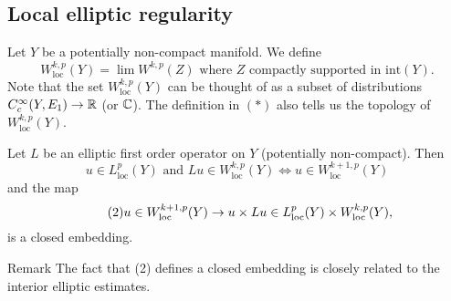 \documentclass{amsart}
\begin{document}
 \subsection*{Local elliptic regularity}
 \begin{defn}
   Let $Y$ be a potentially non-compact manifold. We define
   \begin{equation*}\tag{$\ast$}
     W^{k,p}_{\text{loc}}(Y)=\lim W^{k,p}(Z)\text{ where $Z$ compactly
       supported in $\text{int}(Y)$}.
   \end{equation*}
   Note that the set $W^{k,p}_{\text{loc}}(Y)$ can be thought of as
   a subset of distributions $C^{\infty}_{c}(Y,E_{1})\to \mathbb{R}$ (or
   $\mathbb{C}$). The definition in $(\ast)$ also tells us the topology of
   $W^{k,p}_{\text{loc}}(Y)$.
 \end{defn}
 \begin{thm}\label{thm:localellipticregularity}
   Let $L$ be an elliptic first order operator on $Y$ (potentially
   non-compact). Then
   \begin{equation*}\tag{1}
     u\in L^{p}_{\text{loc}}(Y)\text{ and }Lu\in
     W^{k,p}_{\text{loc}}(Y)\iff u\in W^{k+1,p}_{\text{loc}}(Y)
   \end{equation*}
   and the map
   \begin{equation*}\tag{2}
     u\in W^{k+1,p}_{\text{loc}}(Y)\to u\times Lu\in
     L^{p}_{\text{loc}}(Y)\times W^{k,p}_{\text{loc}}(Y),
   \end{equation*}
   is a closed embedding.
 \end{thm}
 \begin{clear}{Remark}
   The fact that (2) defines a closed embedding is closely related to
   the interior elliptic estimates.
 \end{clear}
\end{document}
